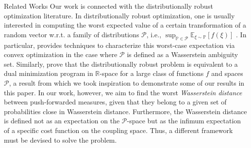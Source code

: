 \documentclass[11pt, a4paper, oneside,reqno]{amsart}
\makeatletter
\def\section{\@startsection{section}{1}%
	\z@{.7\linespacing\@plus\linespacing}{.5\linespacing}%
	{\normalfont\large\bfseries}}
\theoremstyle{plain}
\def\expect{{\mathbb{E}}}
\def\prob{\mathbb{P}}
\def\realNum{{\mathbb{R}}}
\def\sP{{\mathcal{P}}}
\makeatother
\begin{document}
\section{Related Works}
Our work is connected with the distributionally robust optimization literature. In distributionally robust optimization, one is usually interested in computing the worst expected value of a certain transformation of a random vector w.r.t. a family of distributions $\sP$, i.e., $\sup_{\prob \in \sP} \expect_{\xi\sim\prob}[f(\xi)]$ \cite{popescu2007robust, delage2010distributionally, calafiore2006distributionally, gao2023distributionally}. In particular, \cite{mohajerin2018data} provides techniques to characterize this worst-case expectation via convex optimization in the case where $\sP$ is defined as a Wasserstein ambiguity set. %
Similarly, \cite{gao2023distributionally} prove that the distributionally robust problem is equivalent to a dual minimization program in $\realNum$-space for a large class of functions $f$ and spaces $\sP$, a result from which we took inspiration to demonstrate some of our results in this paper. In our work, however, we aim to find the worst \emph{Wasserstein distance} between push-forwarded measures, given that they belong to a given set of probabilities close in Wasserstein distance. Furthermore, the Wasserstein distance is defined not as an expectation on the $\sP$-space but as the infimum expectation of a specific cost function on the coupling space. Thus, a different framework must be devised to solve the problem. 
\end{document}
